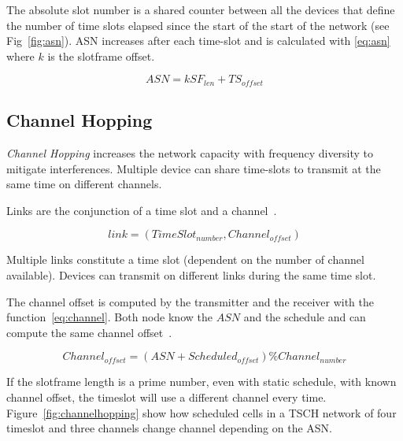 The absolute slot number is a shared counter between all the devices that
define the number of time slots elapsed since the start of the start of the
network (see Fig~\ref{fig:asn}).
ASN increases after each time-slot and is calculated with \ref{eq:asn} where $k$
is the slotframe offset.

\begin{equation}
  \label{eq:asn}
  ASN = k SF_{len} + TS_{offset}
\end{equation}



\subsection{Channel Hopping}

\emph{Channel Hopping} increases the network capacity with frequency diversity
to mitigate interferences.
Multiple device can share time-slots to transmit at the same time on different
channels.

Links are the conjunction of a time slot and a channel~\cite{Chen2013PerformanceAO}.

\begin{equation}
  \label{eq:links}
  link = (TimeSlot_{number}, Channel_{offset})
\end{equation}

Multiple links constitute a time slot (dependent on the number of channel
available). Devices can transmit on different links during the same time slot.


The channel offset is computed by the transmitter and the receiver with the
function~\ref{eq:channel}. Both node know the $ASN$ and the schedule and can
compute the same channel offset~\cite{rfc7554}.

\begin{equation}
  \label{eq:channel}
  Channel_{offset} = (ASN + Scheduled_{offset}) \% Channel_{number}
\end{equation}

If the slotframe length is a prime number, even with static schedule,
with known channel offset, the timeslot will use a different channel every time.
Figure~\ref{fig:channelhopping} show how scheduled cells in a TSCH network of
four timeslot and three channels change channel depending on the ASN.



